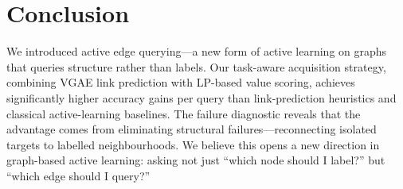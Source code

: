 \documentclass{article}
\begin{document}
\section{Conclusion}
\label{sec:conclusion}

We introduced active edge querying---a new form of active learning on graphs that queries structure rather than labels.
Our task-aware acquisition strategy, combining VGAE link prediction with LP-based value scoring, achieves significantly higher accuracy gains per query than link-prediction heuristics and classical active-learning baselines.
The failure diagnostic reveals that the advantage comes from eliminating structural failures---reconnecting isolated targets to labelled neighbourhoods.
We believe this opens a new direction in graph-based active learning: asking not just ``which node should I label?'' but ``which edge should I query?''




\end{document}
